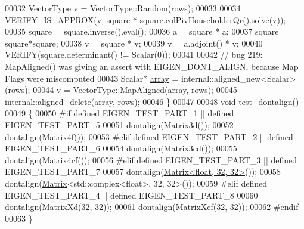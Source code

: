 \begin{DoxyCode}
00032   VectorType v = VectorType::Random(rows);
00033 
00034   VERIFY\_IS\_APPROX(v, square * square.colPivHouseholderQr().solve(v));
00035   square = square.inverse().eval();
00036   a = square * a;
00037   square = square*square;
00038   v = square * v;
00039   v = a.adjoint() * v;
00040   VERIFY(square.determinant() != Scalar(0));
00041 
00042   \textcolor{comment}{// bug 219: MapAligned() was giving an assert with EIGEN\_DONT\_ALIGN, because Map Flags were miscomputed}
00043   Scalar* \hyperlink{class_eigen_1_1array}{array} = internal::aligned\_new<Scalar>(rows);
00044   v = VectorType::MapAligned(array, rows);
00045   internal::aligned\_delete(array, rows);
00046 \}
00047 
00048 \textcolor{keywordtype}{void} test\_dontalign()
00049 \{
00050 \textcolor{preprocessor}{#if defined EIGEN\_TEST\_PART\_1 || defined EIGEN\_TEST\_PART\_5}
00051   dontalign(Matrix3d());
00052   dontalign(Matrix4f());
00053 \textcolor{preprocessor}{#elif defined EIGEN\_TEST\_PART\_2 || defined EIGEN\_TEST\_PART\_6}
00054   dontalign(Matrix3cd());
00055   dontalign(Matrix4cf());
00056 \textcolor{preprocessor}{#elif defined EIGEN\_TEST\_PART\_3 || defined EIGEN\_TEST\_PART\_7}
00057   dontalign(\hyperlink{group___core___module_class_eigen_1_1_matrix}{Matrix<float, 32, 32>}());
00058   dontalign(\hyperlink{group___core___module_class_eigen_1_1_matrix}{Matrix}<std::complex<float>, 32, 32>());
00059 \textcolor{preprocessor}{#elif defined EIGEN\_TEST\_PART\_4 || defined EIGEN\_TEST\_PART\_8}
00060   dontalign(MatrixXd(32, 32));
00061   dontalign(MatrixXcf(32, 32));
00062 \textcolor{preprocessor}{#endif}
00063 \}
\end{DoxyCode}
